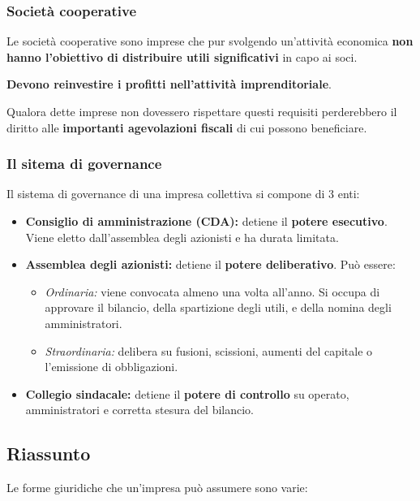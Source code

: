 \documentclass[../main.tex]{subfiles}
\begin{document}
\subsubsection{Società cooperative}

Le società cooperative sono imprese che pur svolgendo un'attività economica \textbf{non hanno l'obiettivo di distribuire utili significativi} in capo ai soci.

\textbf{Devono reinvestire i profitti nell'attività imprenditoriale}.

Qualora dette imprese non dovessero rispettare questi requisiti perderebbero il diritto alle \textbf{importanti agevolazioni fiscali} di cui possono beneficiare.

\subsubsection{Il sitema di governance}

Il sistema di governance di una impresa collettiva si compone di 3 enti:

\begin{itemize}
\item \textbf{Consiglio di amministrazione (CDA):} detiene il \textbf{potere esecutivo}. Viene eletto dall'assemblea degli azionisti e ha durata limitata.
\item \textbf{Assemblea degli azionisti:} detiene il \textbf{potere deliberativo}. Può essere:
	\begin{itemize}
	\item \emph{Ordinaria:} viene convocata almeno una volta all'anno. Si occupa di approvare il bilancio, della spartizione degli utili, e della nomina degli amministratori.
	
	\item \emph{Straordinaria:} delibera su fusioni, scissioni, aumenti del capitale o l'emissione di obbligazioni.
	
	\end{itemize}
\item \textbf{Collegio sindacale:} detiene il \textbf{potere di controllo} su operato, amministratori e corretta stesura del bilancio.
\end{itemize}


\subsection{Riassunto}

Le forme giuridiche che un'impresa può assumere sono varie:
\end{document}

